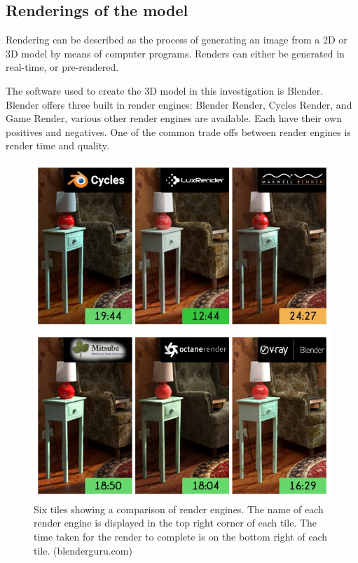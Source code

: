 \documentclass[11pt,a4paper]{report}
\begin{document}
		\subsection{Renderings of the model}
			Rendering can be described as the process of generating an image from a 2D or 3D model by means of computer programs. Renders can either be generated in real-time, or pre-rendered.
			
			The software used to create the 3D model in this investigation is Blender. Blender offers three built in render engines: Blender Render, Cycles Render, and Game Render, various other render engines are available. Each have their own positives and negatives. One of the common trade offs between render engines is render time and quality.
			
			\begin{figure}[H]
				\centering
				\includegraphics[width=1\textwidth]{render_engines}
				\caption[Comparison of render engines]{Six tiles showing a comparison of render engines. The name of each render engine is displayed in the top right corner of each tile. The time taken for the render to complete is on the bottom right of each tile. (blenderguru.com)}
				\label{fig:render_engines}
			\end{figure}
			
\end{document}
